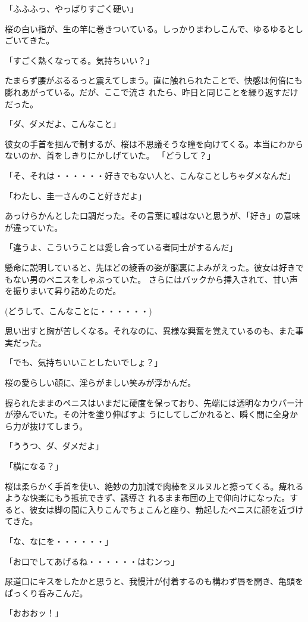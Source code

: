 ﻿\documentclass[book,tate]{jlreq}
\begin{document}
「ふふふっ、やっぱりすごく硬い」

桜の白い指が、生の竿に巻きついている。しっかりまわしこんで、ゆるゆるとしごいてきた。

「すごく熱くなってる。気持ちいい？」

たまらず腰がぶるるっと震えてしまう。直に触れられたことで、快感は何倍にも膨れあがっている。だが、ここで流さ れたら、昨日と同じことを繰り返すだけだった。

「ダ、ダメだよ、こんなこと」

彼女の手首を掴んで制するが、桜は不思議そうな瞳を向けてくる。本当にわからないのか、首をしきりにかしげていた。 「どうして？」

「そ、それは・・・・・・好きでもない人と、こんなことしちゃダメなんだ」

「わたし、圭一さんのこと好きだよ」

あっけらかんとした口調だった。その言葉に嘘はないと思うが、「好き」の意味が違っていた。

「違うよ、こういうことは愛し合っている者同士がするんだ」

懸命に説明していると、先ほどの綾香の姿が脳裏によみがえった。彼女は好きでもない男のペニスをしゃぶっていた。 さらにはバックから挿入されて、甘い声を振りまいて昇り詰めたのだ。

(どうして、こんなことに・・・・・・)

思い出すと胸が苦しくなる。それなのに、異様な興奮を覚えているのも、また事実だった。

「でも、気持ちいいことしたいでしょ？」

桜の愛らしい顔に、淫らがましい笑みが浮かんだ。

握られたままのペニスはいまだに硬度を保っており、先端には透明なカウパー汁が滲んでいた。その汁を塗り伸ばすよ うにしてしごかれると、瞬く間に全身から力が抜けてしまう。

「ううつ、ダ、ダメだよ」

「横になる？」

桜は柔らかく手首を使い、絶妙の力加減で肉棒をヌルヌルと擦ってくる。痺れるような快楽にもう抵抗できず、誘導さ れるまま布団の上で仰向けになった。すると、彼女は脚の間に入りこんでちょこんと座り、勃起したペニスに顔を近づけてきた。

「な、なにを・・・・・・」

「お口でしてあげるね・・・・・・はむンっ」

尿道口にキスをしたかと思うと、我慢汁が付着するのも構わず唇を開き、亀頭をぱっくり呑みこんだ。

「おおおッ！」
\end{document}
